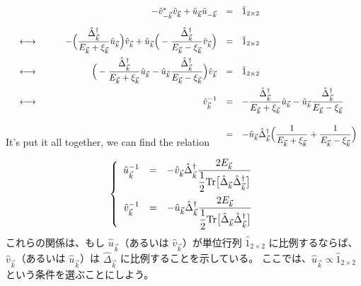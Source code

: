 \documentclass[uplatex,a4j,12pt,dvipdfmx]{jsarticle}
\begin{document}
	\begin{eqnarray}
		\begin{array}{rcrcl}
			 &   &
			- \hat{v}_{-\vec{k}}^{*} \hat{v}_{\vec{k}} + \hat{u}_{\vec{k}} \hat{u}_{-\vec{k}}
			 & = &
			\hat{1}_{2 \times 2}
			\nonumber \\[4mm] &\longleftrightarrow& \hspace{8mm}
			- \Big( \dfrac{ \hat{\Delta}^{\dagger}_{\vec{k}} }{ E_{\vec{k}} + \xi_{\vec{k}} } \hat{u}_{\vec{k}} \Big)
			\hat{v}_{\vec{k}}
			+
			\hat{u}_{\vec{k}}
			\Big( - \dfrac{ \hat{\Delta}^{\dagger}_{\vec{k}} }{ E_{\vec{k}} - \xi_{\vec{k}} } \hat{v}_{\vec{k}} \Big)
			 & = &
			\hat{1}_{2 \times 2}
			\nonumber \\[4mm] &\longleftrightarrow& \hspace{8mm}
			\Big( - \dfrac{ \hat{\Delta}^{\dagger}_{\vec{k}} }{ E_{\vec{k}} + \xi_{\vec{k}} } \hat{u}_{\vec{k}}
			-
			\hat{u}_{\vec{k}}
			\dfrac{ \hat{\Delta}^{\dagger}_{\vec{k}} }{ E_{\vec{k}} - \xi_{\vec{k}} } \Big)
			\hat{v}_{\vec{k}}
			 & = &
			\hat{1}_{2 \times 2}
			\nonumber \\[4mm] &\longleftrightarrow& \hspace{8mm}
			{\hat{v}_{\vec{k}}}^{-1}
			 & = &
			- \dfrac{ \hat{\Delta}^{\dagger}_{\vec{k}} }{ E_{\vec{k}} + \xi_{\vec{k}} } \hat{u}_{\vec{k}}
			-
			\hat{u}_{\vec{k}}
			\dfrac{ \hat{\Delta}^{\dagger}_{\vec{k}} }{ E_{\vec{k}} - \xi_{\vec{k}} }
			\nonumber \\[7mm] &&
			 & = &
			- \hat{u}_{\vec{k}} \hat{\Delta}^{\dagger}_{\vec{k}}
			\Big(
			\dfrac{ 1 }{ E_{\vec{k}} + \xi_{\vec{k}} }
			+
			\dfrac{ 1 }{ E_{\vec{k}} - \xi_{\vec{k}} }
			\Big)
		\end{array}
		\\[-7mm]
	\end{eqnarray}
	It's put it all together, we can find the relation

	\begin{eqnarray}
		\left\{
		\begin{array}{rcl}
			{\hat{u}_{\vec{k}}}^{-1}
			 & = &
			- \hat{v}_{\vec{k}} \hat{\Delta}^{\dagger}_{\vec{k}}
			\dfrac{ 2 E_{\vec{k}} }{ \dfrac{1}{2} {\rm Tr} \big[ \hat{\Delta}_{\vec{k}} \hat{\Delta}^{\dagger}_{\vec{k}} \big] }
			\\[7mm]
			{\hat{v}_{\vec{k}}}^{-1}
			 & = &
			- \hat{u}_{\vec{k}} \hat{\Delta}^{\dagger}_{\vec{k}}
			\dfrac{ 2 E_{\vec{k}} }{ \dfrac{1}{2} {\rm Tr} \big[ \hat{\Delta}_{\vec{k}} \hat{\Delta}^{\dagger}_{\vec{k}} \big] }
		\end{array}
		\right.
	\end{eqnarray}
\fi
これらの関係は、もし $\hat{u}_{\vec{k}}$（あるいは $\hat{v}_{\vec{k}}$）が単位行列 $\hat{1}_{2 \times 2}$ に比例するならば、
$\hat{v}_{\vec{k}}$（あるいは $\hat{u}_{\vec{k}}$）は $\hat{\Delta}_{\vec{k}}$ に比例することを示している。
ここでは、$\hat{u}_{\vec{k}} \propto \hat{1}_{2 \times 2}$ という条件を選ぶことにしよう。
\end{document}
